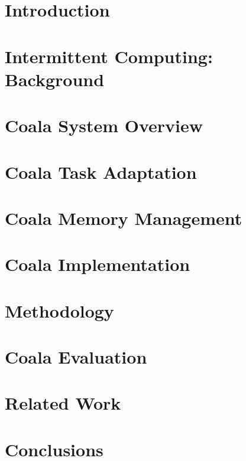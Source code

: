 \documentclass[pageno]{jpaper}
\newcommand{\sys}{Coala\xspace}
\begin{document}
\section{Introduction}
\label{sec:intro}
%

%
\section{Intermittent Computing: Background}
\label{sec:background}
%

%
\section{\sys System Overview}
\label{sec:systemdescription}
%

%
\section{\sys Task Adaptation}
\label{sec:task_adaptation}
%

%

%
\section{\sys Memory Management}
\label{sec:memory_virtulaization}
%

%
\section{\sys Implementation}
\label{sec:implementation}
%

%
%
%
\section{Methodology}
\label{sec:methodology}
%

%
\section{\sys Evaluation}
\label{sec:evaluation}
%

%
\section{Related Work}
\label{sec:related_work}
%

%
\section{Conclusions}
\label{sec:conclusions}
%

%


%
\end{document}
